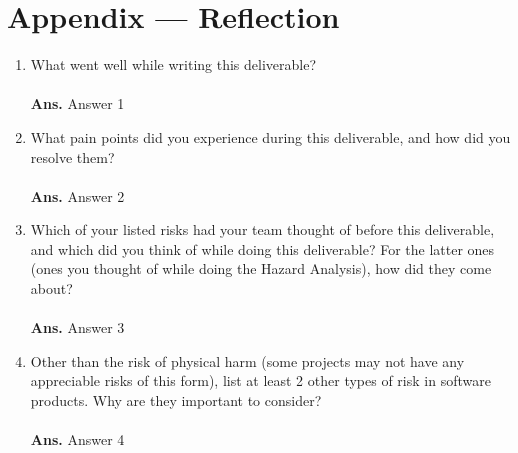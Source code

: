 \documentclass{article}
\begin{document}
\newpage{}

\section*{Appendix --- Reflection}




\begin{enumerate}
    \item What went well while writing this deliverable? \\ \\
    \hspace*{-0.97cm}\textbf{Ans.} Answer 1 \\

    \item What pain points did you experience during this deliverable, and how did you resolve them? \\ \\
    \hspace*{-0.97cm}\textbf{Ans.} Answer 2 \\

    \item Which of your listed risks had your team thought of before this
    deliverable, and which did you think of while doing this deliverable? For
    the latter ones (ones you thought of while doing the Hazard Analysis), how did they come about? \\ \\
    \hspace*{-0.97cm}\textbf{Ans.} Answer 3 \\

    \item Other than the risk of physical harm (some projects may not have any appreciable risks of this form), list at least 2 other types of risk in software products. Why are they important to consider? \\ \\
    \hspace*{-0.97cm}\textbf{Ans.} Answer 4 \\

\end{enumerate}
\end{document}
